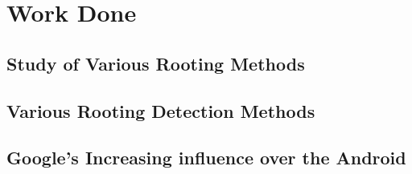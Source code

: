 \chapter{Work Done}

\section{Study of Various Rooting Methods}


\section{Various Rooting Detection Methods}

\section{Google's Increasing influence over the Android}



